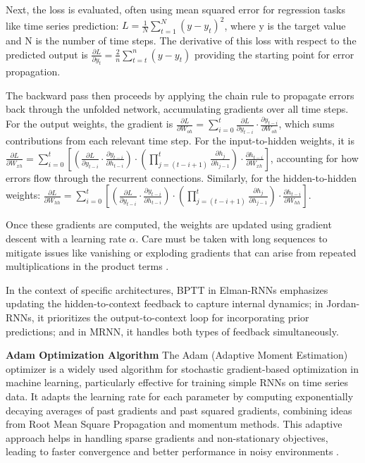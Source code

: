\documentclass[conference, 10pt]{IEEEtran}
\begin{document}
Next, the loss is evaluated, often using mean squared error for regression tasks like time series prediction: \( L =
\frac{1}{N} \sum_{t=1}^{N} (y - y_t)^2 \), where y is the target value and N is the number of time steps. The derivative
of this loss with respect to the predicted output is \( \frac{\partial{L}}{\partial{y_t}} = \frac{2}{n}\sum_{t=t}^{n}(y
- y_t) \) providing the starting point for error propagation.

The backward pass then proceeds by applying the chain rule to propagate errors back through the unfolded network,
accumulating gradients over all time steps. For the output weights, the gradient is \( \frac{\partial L}{\partial
W_{oh}} = \sum_{i=0}^{t} \frac{\partial L}{\partial y_{t-i}} \cdot \frac{\partial y_{t-i}}{\partial W_{oh}} \), which
sums contributions from each relevant time step. For the input-to-hidden weights, it is \( \frac{\partial L}{\partial
W_{xh}} = \sum_{i=0}^{t} \left[ \left( \frac{\partial L}{\partial y_{t-i}} \cdot \frac{\partial y_{t-i}}{\partial
h_{t-i}} \right) \cdot \left( \prod_{j=(t-i+1)}^{t} \frac{\partial h_j}{\partial h_{j-1}} \right) \cdot \frac{\partial
h_{t-i}}{\partial W_{xh}} \right] \), accounting for how errors flow through the recurrent connections. Similarly, for
the hidden-to-hidden weights: \( \frac{\partial L}{\partial W_{hh}} = \sum_{i=0}^{t} \left[ \left( \frac{\partial
L}{\partial y_{t-i}} \cdot \frac{\partial y_{t-i}}{\partial h_{t-i}} \right) \cdot \left( \prod_{j=(t-i+1)}^{t}
\frac{\partial h_j}{\partial h_{j-1}} \right) \cdot \frac{\partial h_{t-i}}{\partial W_{hh}} \right] \). 

Once these gradients are computed, the weights are updated using gradient descent with a learning rate \( \alpha \).
Care must be taken with long sequences to mitigate issues like vanishing or exploding gradients that can arise from
repeated multiplications in the product terms \cite{quarkmlBackpropagationThrough}.

In the context of specific architectures, BPTT in Elman-RNNs emphasizes updating the hidden-to-context feedback to
capture internal dynamics; in Jordan-RNNs, it prioritizes the output-to-context loop for incorporating prior
predictions; and in MRNN, it handles both types of feedback simultaneously.

\textbf{Adam Optimization Algorithm}
The Adam (Adaptive Moment Estimation) optimizer is a widely used algorithm for stochastic gradient-based optimization in
machine learning, particularly effective for training simple RNNs on time series data. It adapts the learning rate for
each parameter by computing exponentially decaying averages of past gradients and past squared gradients, combining
ideas from Root Mean Square Propagation and momentum methods. This adaptive approach helps in handling sparse gradients
and non-stationary objectives, leading to faster convergence and better performance in noisy environments
\cite{kingma2017adammethodstochasticoptimization} \cite{machinelearningmasteryGentleIntroduction}.
\end{document}
